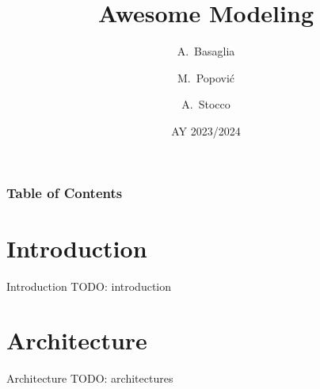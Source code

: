 \documentclass{beamer}
\title{Awesome Modeling}
\institute{University of Padua}
\date{AY 2023/2024}
\author[Basaglia, Popović, Stocco]
{A.~Basaglia\inst{1} \and M.~Popović\inst{1} \and A.~Stocco\inst{1}}
\institute[UniPD]
{
  \inst{1}
  University of Padua
}
\begin{document}
\frame{\titlepage}

\begin{frame}
\frametitle{Table of Contents}
\tableofcontents
\end{frame}

\section{Introduction}
\begin{frame}{Introduction}
        TODO: introduction
\end{frame}

\section{Architecture}
\begin{frame}{Architecture}
        TODO: architectures
\end{frame}
\end{document}

